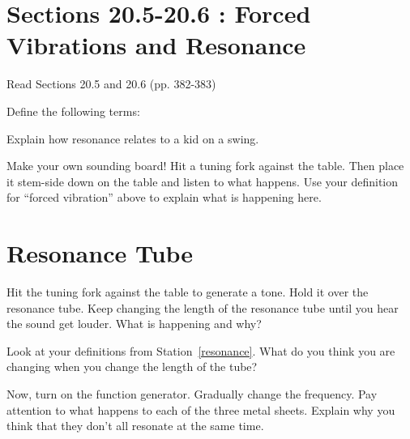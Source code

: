 \documentclass[10pt]{exam}
\begin{document}
\section{Sections 20.5-20.6 : Forced Vibrations and Resonance}

Read Sections 20.5 and 20.6 (pp. 382-383)

\begin{questions}
  \label{resonance}

  \question
    Define the following terms:


  \question
    Explain how resonance relates to a kid on a swing. \vs

  \question
    Make your own sounding board!  Hit a tuning fork against the table.  Then place it stem-side down on the table and listen to what happens.  Use your definition for ``forced vibration'' above to explain what is happening here. \vs
  
\end{questions}

\section{Resonance Tube}

\begin{questions}
  \question
    Hit the tuning fork against the table to generate a tone.  Hold it over the resonance tube.  Keep changing the length of the resonance tube until you hear the sound get louder.  What is happening and why? \vs

  \question
    Look at your definitions from Station~\ref{resonance}.  What do you think you are changing when you change the length of the tube? \vs

  \question
    Now, turn on the function generator.  Gradually change the frequency.  Pay attention to what happens to each of the three metal sheets.  Explain why you think that they don't all resonate at the same time. \vs
    
\end{questions}
\end{document}

